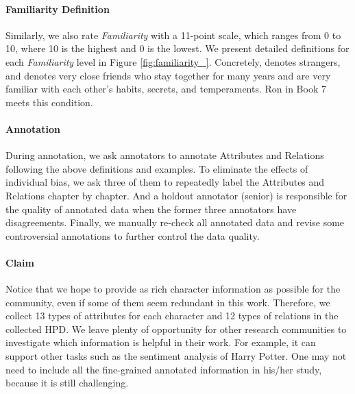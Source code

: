 \documentclass[11pt]{article}
\begin{document}
\paragraph{Familiarity Definition} Similarly, we also rate \textit{Familiarity} with a 11-point scale, which ranges from 0 to 10, where 10 is the highest and 0 is the lowest. We present detailed definitions for each \textit{Familiarity} level in Figure \ref{fig:familiarity_}.
Concretely,  denotes strangers, and  denotes very close friends who stay together for many years and are very familiar with each other's habits, secrets, and temperaments. Ron in Book 7 meets this condition.



\paragraph{Annotation}
During annotation,
we ask annotators to annotate Attributes and Relations following the above definitions and examples.
To eliminate the effects of individual bias, we ask three of them to repeatedly label the Attributes and Relations chapter by chapter. And a holdout annotator (senior) is responsible for the quality of annotated data when the former three annotators have disagreements. Finally, we manually re-check all annotated data and revise some controversial annotations to further control the data quality.

\paragraph{Claim} Notice that we hope to provide as  rich character information as possible for the community, even if some of them seem redundant in this work. Therefore, we collect 13 types of attributes for each character and 12 types of relations in the collected HPD.
We leave plenty of opportunity for other research communities to investigate which information is helpful in their work.  For example, it can support other tasks such as the sentiment analysis of Harry Potter. One may not need to include all the fine-grained annotated information in his/her study, because it is still challenging.
\end{document}
